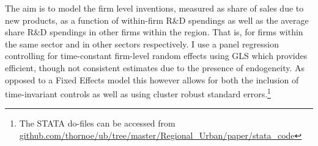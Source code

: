 \label{sec:empirics}
The aim is to model the firm level inventions, measured as share of sales due to new products, as a function of within-firm R\&D spendings as well as the average share R\&D spendings in other firms within the region. That is, for firms within the same sector and in other sectors respectively. I use a panel regression controlling for time-constant firm-level random effects using GLS which provides efficient, though not consistent estimates due to the presence of endogeneity. As opposed to a Fixed Effects model this however allows for both the inclusion of time-invariant controls as well as using cluster robust standard errors.\footnote{The STATA do-files can be accessed from \href{https://github.com/thornoe/ub/tree/master/Regional_Urban/paper/stata_code}{github.com/thornoe/ub/tree/master/Regional\_Urban/paper/stata\_code}}
